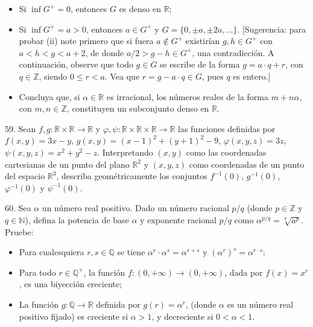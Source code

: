 \documentclass[12pt,oneside]{book}
\begin{document}
\begin{itemize}
    \item [i)] Si \(\inf G^+ = 0\), entonces \(G\) es denso en \(\mathbb{R}\);
    \item [ii)] Si \(\inf G^+ = a > 0\), entonces \(a \in G^+\) y \(G = \{0, \pm a, \pm 2a, \dots\}\). [Sugerencia: para probar (ii) note primero que si fuera \(a \notin G^+\) existirían \(g, h \in G^+\) con \(a < h < g < a + 2\), de donde \(a/2 > g - h \in G^+\), una contradicción. A continuación, observe que todo \(g \in G\) se escribe de la forma \(g = a \cdot q + r\), con \(q \in \mathbb{Z}\), siendo \(0 \leq r < a\). Vea que \(r = g - a \cdot q \in G\), pues \(q\) es entero.]
    \item [iii)] Concluya que, si \(\alpha \in \mathbb{R}\) es irracional, los números reales de la forma \(m + n\alpha\), con \(m, n \in \mathbb{Z}\), constituyen un subconjunto denso en \(\mathbb{R}\).
\end{itemize}

59. Sean \(f, g: \mathbb{R} \times \mathbb{R} \to \mathbb{R}\) y \(\varphi, \psi: \mathbb{R} \times \mathbb{R} \times \mathbb{R} \to \mathbb{R}\) las funciones definidas por \(f(x, y) = 3x - y\), \(g(x, y) = (x - 1)^2 + (y + 1)^2 - 9\), \(\varphi(x, y, z) = 3z\), \(\psi(x, y, z) = x^2 + y^2 - z\). Interpretando \((x, y)\) como las coordenadas cartesianas de un punto del plano \(\mathbb{R}^2\) y \((x, y, z)\) como coordenadas de un punto del espacio \(\mathbb{R}^3\), describa geométricamente los conjuntos \(f^{-1}(0)\), \(g^{-1}(0)\), \(\varphi^{-1}(0)\) y \(\psi^{-1}(0)\).

60. Sea \(\alpha\) un número real positivo. Dado un número racional \(p/q\) (donde \(p \in \mathbb{Z}\) y \(q \in \mathbb{N}\)), defina la potencia de base \(\alpha\) y exponente racional \(p/q\) como \(\alpha^{p/q} = \sqrt[q]{a^p}\). Pruebe:

\begin{itemize}
    \item [1°)] Para cualesquiera \(r, s \in \mathbb{Q}\) se tiene \(\alpha^r \cdot \alpha^s = \alpha^{r+s}\) y \((\alpha^r)^s = \alpha^{r \cdot s}\);
    \item [2°)] Para todo \(r \in \mathbb{Q}^+\), la función \(f: (0, +\infty) \to (0, +\infty)\), dada por \(f(x) = x^r\), es una biyección creciente;
    \item [3°)] La función \(g: \mathbb{Q} \to \mathbb{R}\) definida por \(g(r) = \alpha^r\), (donde \(\alpha\) es un número real positivo fijado) es creciente si \(\alpha > 1\), y decreciente si \(0 < \alpha < 1\).
\end{itemize}
\end{document}
